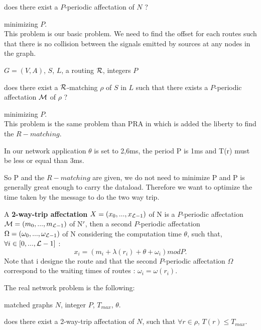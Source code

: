 \documentclass{article}
\begin{document}
 does there exist a $P$-periodic affectation of $N$ ?

 minimizing $P$.\\

This problem is our basic problem. We need to find the offset for each routes such that there is no collision between the signals emitted by sources at any nodes in the graph.\\


 $G=(V,A)$, $S$, $L$,  a routing $\cal R$, integers $P$

 does there exist  a ${\cal R}$-matching $\rho$ of $S$ in $L$ such that there exists a $P$-periodic affectation $\cal M$ of $\rho$ ?

 minimizing $P$.\\

This problem is the same problem than PRA in which is added the liberty to find the $R-matching$.

In our network application $\theta$ is set to 2,6ms, the period P is 1ms and T(r) must be less or equal than 3ms.

So P and the $R-matching$ are given, we do not need to minimize P and P is generally great enough to carry the dataload.
Therefore we want to optimize the time taken by the message to do the two way trip.

A {\bf 2-way-trip affectation} $X = (x_0,...,x_{{\cal L}-1})$ of N is a $P$-periodic affectation ${\cal M} = (m_0,...,m_{{\cal L}-1})$ of N$^r$, 
then a second $P$-periodic affectation ${\Omega} = (\omega_0,...,\omega_{{\cal L}-1}) $ of N considering the computation time $\theta$, such that, $\forall i \in [0,...,{\cal L}-1]$ :
$$ x_i = ( m_i + \lambda(r_i) + \theta + \omega_i ) mod P .$$
Note that i designe the route and that the second $P$-periodic affectation ${\Omega}$ correspond to the waiting times of routes : $\omega_i = \omega(r_i)$.

The real network problem is the following:\\


 matched graphs $N$, integer $P$, $ T_{max}$, $\theta$.

 does there exist a 2-way-trip affectation of $N$, such that $\forall r \in \rho$, $T(r) \le T_{max}$.
\end{document}
